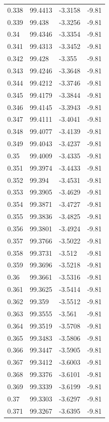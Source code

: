 \begin{tabular}{llll}
0.338 & 99.4413 & -3.3158 & -9.81 \\
0.339 & 99.438 & -3.3256 & -9.81 \\
0.34 & 99.4346 & -3.3354 & -9.81 \\
0.341 & 99.4313 & -3.3452 & -9.81 \\
0.342 & 99.428 & -3.355 & -9.81 \\
0.343 & 99.4246 & -3.3648 & -9.81 \\
0.344 & 99.4212 & -3.3746 & -9.81 \\
0.345 & 99.4179 & -3.3844 & -9.81 \\
0.346 & 99.4145 & -3.3943 & -9.81 \\
0.347 & 99.4111 & -3.4041 & -9.81 \\
0.348 & 99.4077 & -3.4139 & -9.81 \\
0.349 & 99.4043 & -3.4237 & -9.81 \\
0.35 & 99.4009 & -3.4335 & -9.81 \\
0.351 & 99.3974 & -3.4433 & -9.81 \\
0.352 & 99.394 & -3.4531 & -9.81 \\
0.353 & 99.3905 & -3.4629 & -9.81 \\
0.354 & 99.3871 & -3.4727 & -9.81 \\
0.355 & 99.3836 & -3.4825 & -9.81 \\
0.356 & 99.3801 & -3.4924 & -9.81 \\
0.357 & 99.3766 & -3.5022 & -9.81 \\
0.358 & 99.3731 & -3.512 & -9.81 \\
0.359 & 99.3696 & -3.5218 & -9.81 \\
0.36 & 99.3661 & -3.5316 & -9.81 \\
0.361 & 99.3625 & -3.5414 & -9.81 \\
0.362 & 99.359 & -3.5512 & -9.81 \\
0.363 & 99.3555 & -3.561 & -9.81 \\
0.364 & 99.3519 & -3.5708 & -9.81 \\
0.365 & 99.3483 & -3.5806 & -9.81 \\
0.366 & 99.3447 & -3.5905 & -9.81 \\
0.367 & 99.3412 & -3.6003 & -9.81 \\
0.368 & 99.3376 & -3.6101 & -9.81 \\
0.369 & 99.3339 & -3.6199 & -9.81 \\
0.37 & 99.3303 & -3.6297 & -9.81 \\
0.371 & 99.3267 & -3.6395 & -9.81 \\

\end{tabular}
